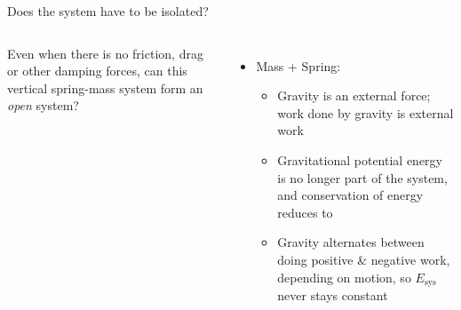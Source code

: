 \documentclass[12pt,compress,aspectratio=169]{beamer}
\begin{document}
\begin{frame}[t]{Does the system have to be isolated?}
  \begin{columns}[T]
    \centering

    Even when there is no friction, drag or other damping forces, can this
    vertical spring-mass system form an \emph{open} system?
    \begin{itemize}
    \item Mass + Spring:
      \begin{itemize}
      \item Gravity is an external force; {\color{red}work done by gravity} is
        external work
      \item Gravitational potential energy is no longer part of the system,
        and conservation of energy reduces to


      \item\vspace{-.15in}Gravity alternates between doing positive \& negative
        work, depending on motion, so $E_\text{sys}$ never stays constant
      \end{itemize}
    \end{itemize}
  \end{columns}
\end{frame}
\end{document}

